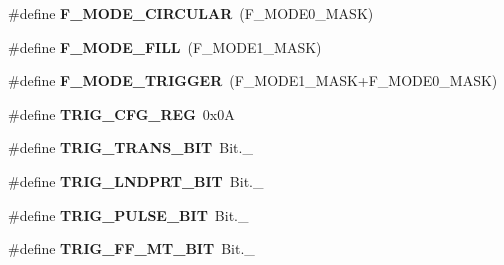 \begin{DoxyCompactItemize}
\item 
\hypertarget{group___engduino_accelerometer_gaf1c5054f617a7f0b41d6a9c84fdae22d}{}\#define {\bfseries F\+\_\+\+M\+O\+D\+E\+\_\+\+C\+I\+R\+C\+U\+L\+A\+R}~(F\+\_\+\+M\+O\+D\+E0\+\_\+\+M\+A\+S\+K)\label{group___engduino_accelerometer_gaf1c5054f617a7f0b41d6a9c84fdae22d}

\item 
\hypertarget{group___engduino_accelerometer_ga863b05ee1ea444a3e47f8bb87957e043}{}\#define {\bfseries F\+\_\+\+M\+O\+D\+E\+\_\+\+F\+I\+L\+L}~(F\+\_\+\+M\+O\+D\+E1\+\_\+\+M\+A\+S\+K)\label{group___engduino_accelerometer_ga863b05ee1ea444a3e47f8bb87957e043}

\item 
\hypertarget{group___engduino_accelerometer_gaa38a88af737b847a17725b71197b3d92}{}\#define {\bfseries F\+\_\+\+M\+O\+D\+E\+\_\+\+T\+R\+I\+G\+G\+E\+R}~(F\+\_\+\+M\+O\+D\+E1\+\_\+\+M\+A\+S\+K+F\+\_\+\+M\+O\+D\+E0\+\_\+\+M\+A\+S\+K)\label{group___engduino_accelerometer_gaa38a88af737b847a17725b71197b3d92}

\item 
\hypertarget{group___engduino_accelerometer_ga0278c455e363bc8cec61f9aef113dcab}{}\#define {\bfseries T\+R\+I\+G\+\_\+\+C\+F\+G\+\_\+\+R\+E\+G}~0x0\+A\label{group___engduino_accelerometer_ga0278c455e363bc8cec61f9aef113dcab}

\item 
\hypertarget{group___engduino_accelerometer_gae03682e0a5d6385f98b55f8d60dd133f}{}\#define {\bfseries T\+R\+I\+G\+\_\+\+T\+R\+A\+N\+S\+\_\+\+B\+I\+T}~Bit.\+\_\label{group___engduino_accelerometer_gae03682e0a5d6385f98b55f8d60dd133f}

\item 
\hypertarget{group___engduino_accelerometer_ga5ccfa4141b896a74654dff5cf1a90042}{}\#define {\bfseries T\+R\+I\+G\+\_\+\+L\+N\+D\+P\+R\+T\+\_\+\+B\+I\+T}~Bit.\+\_\label{group___engduino_accelerometer_ga5ccfa4141b896a74654dff5cf1a90042}

\item 
\hypertarget{group___engduino_accelerometer_gae2422a36f457853da4a55f4c0594b7c7}{}\#define {\bfseries T\+R\+I\+G\+\_\+\+P\+U\+L\+S\+E\+\_\+\+B\+I\+T}~Bit.\+\_\label{group___engduino_accelerometer_gae2422a36f457853da4a55f4c0594b7c7}

\item 
\hypertarget{group___engduino_accelerometer_ga459b0aa5071de9f2f749946ebd21cca2}{}\#define {\bfseries T\+R\+I\+G\+\_\+\+F\+F\+\_\+\+M\+T\+\_\+\+B\+I\+T}~Bit.\+\_\label{group___engduino_accelerometer_ga459b0aa5071de9f2f749946ebd21cca2}


\end{DoxyCompactItemize}
